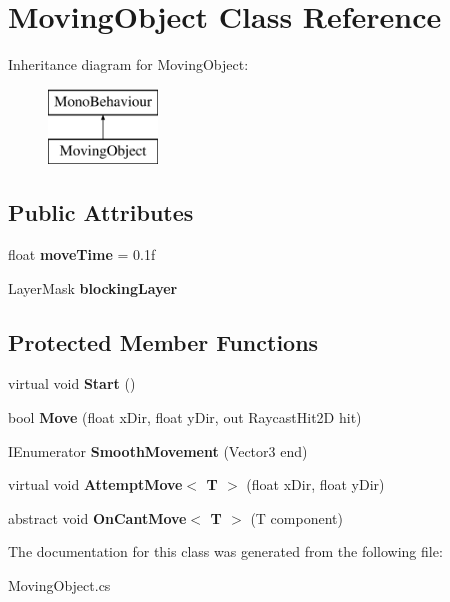 \hypertarget{class_moving_object}{}\section{Moving\+Object Class Reference}
\label{class_moving_object}
Inheritance diagram for Moving\+Object\+:\begin{figure}[H]
\begin{center}
\leavevmode
\includegraphics[height=2.000000cm]{class_moving_object}
\end{center}
\end{figure}
\subsection*{Public Attributes}
\begin{DoxyCompactItemize}
\item 
\mbox{\label{class_moving_object_a2596eb0312a148176541ac08fb18b173}} 
float {\bfseries move\+Time} = 0.\+1f
\item 
\mbox{\label{class_moving_object_add4cf20e336559d38cc6a57763775e36}} 
Layer\+Mask {\bfseries blocking\+Layer}
\end{DoxyCompactItemize}
\subsection*{Protected Member Functions}
\begin{DoxyCompactItemize}
\item 
\mbox{\label{class_moving_object_a2b6026a8e7e4313764cb876fd99ae1cd}} 
virtual void {\bfseries Start} ()
\item 
\mbox{\label{class_moving_object_a3d8df930ae96d375fc1863b483e1c2e5}} 
bool {\bfseries Move} (float x\+Dir, float y\+Dir, out Raycast\+Hit2D hit)
\item 
\mbox{\label{class_moving_object_ab5b0553c2da577c976c7f1416ff6605a}} 
I\+Enumerator {\bfseries Smooth\+Movement} (Vector3 end)
\item 
\mbox{\label{class_moving_object_a9cb5a5729151a4f9745a24988176f620}} 
virtual void {\bfseries Attempt\+Move$<$ T $>$} (float x\+Dir, float y\+Dir)
\item 
\mbox{\label{class_moving_object_af20de314364d109abfad1fe0f15d4732}} 
abstract void {\bfseries On\+Cant\+Move$<$ T $>$} (T component)
\end{DoxyCompactItemize}


The documentation for this class was generated from the following file\+:\begin{DoxyCompactItemize}
\item 
Moving\+Object.\+cs\end{DoxyCompactItemize}
